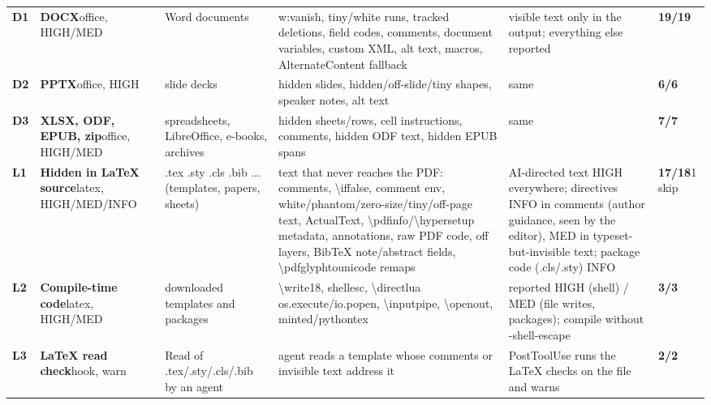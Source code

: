 \documentclass[10pt,a4paper]{article}
\begin{document}
\begin{longtable}{@{}P{0.6cm}P{2.6cm}P{3.1cm}P{4.4cm}P{4.4cm}P{1.4cm}@{}}
\textbf{D1} & \textbf{DOCX}\newline\footnotesize office, HIGH/MED & \footnotesize Word documents & \footnotesize w:vanish, tiny/white runs, tracked deletions, field codes, comments, document variables, custom XML, alt text, macros, AlternateContent fallback & \footnotesize visible text only in the output; everything else reported & \textcolor{ok}{\textbf{19/19}}\\
\textbf{D2} & \textbf{PPTX}\newline\footnotesize office, HIGH & \footnotesize slide decks & \footnotesize hidden slides, hidden/off-slide/tiny shapes, speaker notes, alt text & \footnotesize same & \textcolor{ok}{\textbf{6/6}}\\
\textbf{D3} & \textbf{XLSX, ODF, EPUB, zip}\newline\footnotesize office, HIGH/MED & \footnotesize spreadsheets, LibreOffice, e-books, archives & \footnotesize hidden sheets/rows, cell instructions, comments, hidden ODF text, hidden EPUB spans & \footnotesize same & \textcolor{ok}{\textbf{7/7}}\\
\textbf{L1} & \textbf{Hidden in LaTeX source}\newline\footnotesize latex, HIGH/MED/INFO & \footnotesize .tex .sty .cls .bib ... (templates, papers, sheets) & \footnotesize text that never reaches the PDF: comments, \textbackslash{}iffalse, comment env, white/phantom/zero-size/tiny/off-page text, ActualText, \textbackslash{}pdfinfo/\textbackslash{}hypersetup metadata, annotations, raw PDF code, off layers, BibTeX note/abstract fields, \textbackslash{}pdfglyphtounicode remaps & \footnotesize AI-directed text HIGH everywhere; directives INFO in comments (author guidance, seen by the editor), MED in typeset-but-invisible text; package code (.cls/.sty) INFO & \textcolor{ok}{\textbf{17/18}}\newline\footnotesize 1 skip\\
\textbf{L2} & \textbf{Compile-time code}\newline\footnotesize latex, HIGH/MED & \footnotesize downloaded templates and packages & \footnotesize \textbackslash{}write18, shellesc, \textbackslash{}directlua os.execute/io.popen, \textbackslash{}input\textbar{}pipe, \textbackslash{}openout, minted/pythontex & \footnotesize reported HIGH (shell) / MED (file writes, packages); compile without -shell-escape & \textcolor{ok}{\textbf{3/3}}\\
\textbf{L3} & \textbf{LaTeX read check}\newline\footnotesize hook, warn & \footnotesize Read of .tex/.sty/.cls/.bib by an agent & \footnotesize agent reads a template whose comments or invisible text address it & \footnotesize PostToolUse runs the LaTeX checks on the file and warns & \textcolor{ok}{\textbf{2/2}}\\

\end{longtable}
\end{document}
